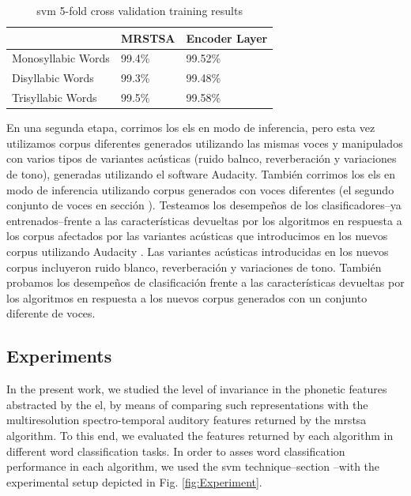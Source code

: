 {\begin{table}[h!]
\centering
\caption{\gls{svm} 5-fold cross validation training results}
\begin{tabular}{|l|l|l|}
\hline
		   & MRSTSA & Encoder Layer \\ \hline
Monosyllabic Words & 99.4\% & 99.52\%          \\ \hline
Disyllabic Words   & 99.3\%   & 99.48\%        \\ \hline
Trisyllabic Words  & 99.5\% & 99.58\%          \\ \hline
\end{tabular}
\label{SVM_Training}
\end{table}

En una segunda etapa, corrimos los \glspl{el} en modo de inferencia, pero esta vez utilizamos corpus diferentes generados utilizando las mismas voces y manipulados con varios tipos de variantes acústicas (ruido balnco, reverberación y variaciones de tono), generadas utilizando el software Audacity. También corrimos los \glspl{el} en modo de inferencia utilizando corpus generados con voces diferentes (el segundo conjunto de voces en sección ). Testeamos los desempeños de los clasificadores--ya entrenados--frente a las características devueltas por los algoritmos en respuesta a los corpus afectados por las variantes acústicas que introducimos en los nuevos corpus utilizando Audacity \cite{audacity}. Las variantes acústicas introducidas en los nuevos corpus incluyeron ruido blanco, reverberación y variaciones de tono. También probamos los desempeños de clasificación frente a las características devueltas por los algoritmos en respuesta a los nuevos corpus generados con un conjunto diferente de voces.
}{
\subsection{Experiments}

In the present work, we studied the level of invariance in the phonetic features abstracted by the \gls{el}, by means of comparing such representations with the multiresolution spectro-temporal auditory features returned by the \gls{mrstsa} algorithm. To this end, we evaluated the features returned by each algorithm in different word classification tasks. In order to asses word classification performance in each algorithm, we used the \gls{svm} technique--section --with  the experimental setup depicted in Fig. \ref{fig:Experiment}.

}
